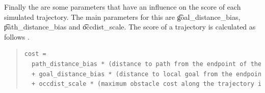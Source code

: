 Finally the are some parameters that have an influence on the score of each simulated trajectory. The main parameters for this are \t{goal_distance_bias}, \t{path_distance_bias} and \t{occdist_scale}. The score of a trajectory is calculated as follows \cite{ROSorg}.

\begin{quote}
\begin{lstlisting}[language = XML]
	cost =
  path_distance_bias * (distance to path from the endpoint of the trajectory in meters)
  + goal_distance_bias * (distance to local goal from the endpoint of the trajectory in meters)
  + occdist_scale * (maximum obstacle cost along the trajectory in obstacle cost (0-254))roslaunch navigation exercise5.launch
\end{lstlisting}
\end{quote}

